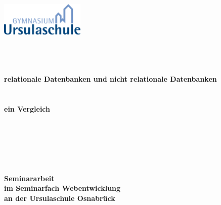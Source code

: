  \thispagestyle{empty}
\begin{titlepage}
	 \thispagestyle{empty}
\begin{center}
	 \thispagestyle{empty}

\begin{center}
	\includegraphics[width=4cm]{"Ursulaschule Logo"}
\end{center}

$~~$\\
\paragraph{}$~~$\\
\textbf{\huge relationale Datenbanken und nicht relationale Datenbanken}\paragraph{}$~~$\\
\textbf{\huge ein Vergleich}\paragraph{}$~~$\\
\paragraph{}$~~$\\
\paragraph{}$~~$\\
\textbf{Seminararbeit}\\ \textbf{im Seminarfach Webentwicklung}\\ \textbf{an der Ursulaschule Osnabrück}
\paragraph{}$~~$\\

\end{center}
\end{titlepage}
